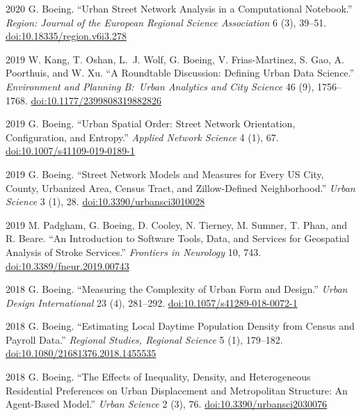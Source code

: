 \documentclass[11pt,letterpaper]{report}
\begin{document}
\begin{tablist}
        \item[2020] \tab{}G. Boeing. \enquote{Urban Street Network Analysis in a Computational Notebook.} \textit{Region: Journal of the European Regional Science Association} 6 (3), 39--51. \href{https://doi.org/10.18335/region.v6i3.278}{doi:10.18335/region.v6i3.278}

        \item[2019] \tab{}W. Kang, T. Oshan, L.~J. Wolf, G. Boeing, V. Frias-Martinez, S. Gao, A. Poorthuis, and W. Xu. \enquote{A Roundtable Discussion: Defining Urban Data Science.} \textit{Environment and Planning B:\ Urban Analytics and City Science} 46 (9), 1756--1768. \href{https://doi.org/10.1177/2399808319882826}{doi:10.1177/2399808319882826}

        \item[2019] \tab{}G. Boeing. \enquote{Urban Spatial Order: Street Network Orientation, Configuration, and Entropy.} \textit{Applied Network Science} 4 (1), 67. \href{https://doi.org/10.1007/s41109-019-0189-1}{doi:10.1007/s41109-019-0189-1}

        \item[2019] \tab{}G. Boeing. \enquote{Street Network Models and Measures for Every US City, County, Urbanized Area, Census Tract, and Zillow-Defined Neighborhood.} \textit{Urban Science} 3 (1), 28. \href{https://doi.org/10.3390/urbansci3010028}{doi:10.3390/urbansci3010028}

        \item[2019] \tab{}M. Padgham, G. Boeing, D. Cooley, N. Tierney, M. Sumner, T. Phan, and R. Beare. \enquote{An Introduction to Software Tools, Data, and Services for Geospatial Analysis of Stroke Services.} \textit{Frontiers in Neurology} 10, 743. \href{https://doi.org/10.3389/fneur.2019.00743}{doi:10.3389/fneur.2019.00743}

        \item[2018] \tab{}G. Boeing. \enquote{Measuring the Complexity of Urban Form and Design.} \textit{Urban Design International} 23 (4), 281--292. \href{https://doi.org/10.1057/s41289-018-0072-1}{doi:10.1057/s41289-018-0072-1}

        \item[2018] \tab{}G. Boeing. \enquote{Estimating Local Daytime Population Density from Census and Payroll Data.} \textit{Regional Studies, Regional Science} 5 (1), 179--182. \href{https://doi.org/10.1080/21681376.2018.1455535}{doi:10.1080/21681376.2018.1455535}

        \item[2018] \tab{}G. Boeing. \enquote{The Effects of Inequality, Density, and Heterogeneous Residential Preferences on Urban Displacement and Metropolitan Structure: An Agent-Based Model.} \textit{Urban Science} 2 (3), 76. \href{https://doi.org/10.3390/urbansci2030076}{doi:10.3390/urbansci2030076}


\end{tablist}
\end{document}
